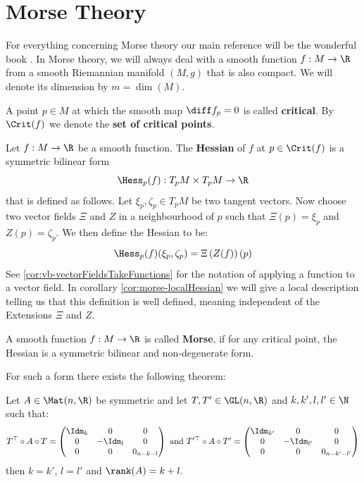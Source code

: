 \section{Morse Theory}

For everything concerning Morse theory our main reference will be the wonderful book \cite{banyaga2004lectures}. 
In Morse theory, we will always deal with a smooth function $f:M\to \R$ from a smooth Riemannian manifold $(M,g)$ that is also compact. We will denote its dimension by $m=\dim (M)$.
\begin{definition}
	A point $p\in M$ at which the smooth map  
$\diff f _p=0$  is called \textbf{critical}. By $\Crit (f)$ we denote the \textbf{set of critical points}.
\end{definition}

\begin{definition}
	Let $f:M\to \R$ be a smooth function. The \textbf{Hessian} of $f$ at $p\in \Crit(f)$ is a symmetric bilinear form
	\begin{equation*}
		\Hess_p(f):T_pM\times T_pM \to \R
	\end{equation*}  that is defined as follows. Let $\xi_p, \zeta_p\in T_pM$ be two tangent vectors. Now choose two vector fields $\Xi$ and $Z$ in a neighbourhood of $p$ such that $\Xi(p)=\xi_p$ and $Z(p)=\zeta_p$. We then define the Hessian to be: 
	\begin{equation*}
		\Hess_p(f)(\xi_p,\zeta_p)=\Xi \left(Z (f)\right)(p)
	\end{equation*} See \ref{cor:vb-vectorFieldsTakeFunctions} for the notation of applying a function to a vector field. In corollary \ref{cor:morse-localHessian} we will give a local description telling us that this definition is well defined, meaning independent of the Extensions $\Xi$ and $Z$.  
\end{definition}
\begin{definition}
	A smooth function $f: M\to \R$ is called \textbf{Morse}, if for any critical point, the Hessian is a symmetric bilinear and non-degenerate form.
\end{definition}
 For such a form there exists the following theorem: 
 \begin{theorem}
 	Let $A\in \Mat(n,\R)$ be symmetric and let $T,T'\in \GL(n,\R)$ and $k,k',l,l'\in \N$ such that:
 	\begin{align*}
 		T^\top \circ A\circ T=	\begin{pmatrix}
 			\Idm_k& 0 &0\\
 			0& -\Idm_l&0\\
 			0&0&0_{n-k-l}
 		\end{pmatrix}\text{ and } 
 		T'^\top \circ A \circ T'=
 		\begin{pmatrix}
 			\Idm_{k'}& 0 &0\\
 			0& -\Idm_{l'}&0\\
 			0&0&0_{n-k'-l'}
 		\end{pmatrix}
 	\end{align*}
 	then $k=k'$, $l=l'$ and $\rank(A)=k+l.$
 \end{theorem}
 
